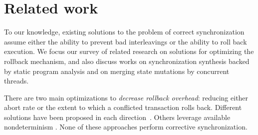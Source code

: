 \section{Related work}
To our knowledge, existing solutions to the problem of correct synchronization assume either the ability to prevent bad interleavings or the ability to roll back execution. We focus our survey of related research on solutions for optimizing the rollback mechanism, and also discuss works on synchronization synthesis backed by static program analysis and on merging state mutations by concurrent threads.

There are two main optimizations to \emph{decrease rollback overhead}:
reducing either abort rate or the extent to which a conflicted
transaction rolls back. Different solutions have been proposed in
each direction~\cite{ppopp/HerlihyK08,Galois,TYFS:OOPSLA11}.
Others leverage available nondeterminism
\cite{TKS:OOPSLA13}. None of these approaches perform corrective
synchronization.
%
%
%
%
%
